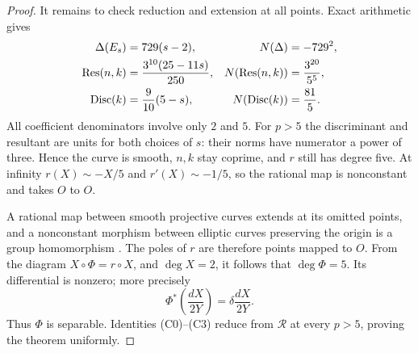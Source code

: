 \documentclass[11pt,a4paper]{article}
\theoremstyle{remark}
\DeclareMathOperator{\Res}{Res}
\DeclareMathOperator{\Disc}{Disc}
\begin{document}
\begin{proof}
It remains to check reduction and extension at all points. Exact
arithmetic gives
\begin{align}\label{eq:good-reduction}
 \Delta(E_s)&=729(s-2),&N(\Delta)&=-729^2,\notag\\
 \Res(n,k)&=\frac{3^{10}(25-11s)}{250},&
 N(\Res(n,k))&=\frac{3^{20}}{5^5},\\
 \Disc(k)&=\frac9{10}(5-s),&N(\Disc(k))&=\frac{81}{5}.\notag
\end{align}
All coefficient denominators involve only $2$ and $5$. For $p>5$
the discriminant and resultant are units for both choices of $s$:
their norms have numerator a power of three. Hence the curve is
smooth, $n,k$ stay coprime, and $r$ still has degree five. At infinity
$r(X)\sim-X/5$ and $r'(X)\sim-1/5$, so the rational map is
nonconstant and takes $O$ to $O$.

A rational map between smooth projective curves extends at its
omitted points, and a nonconstant morphism between elliptic curves
preserving the origin is a group homomorphism
\cite[Theorem~4.15 and Definition~4.20]{suth4}. The poles of $r$ are
therefore points mapped to $O$. From the diagram
$X\circ\Phi=r\circ X$, and $\deg X=2$, it follows that
$\deg\Phi=5$. Its differential is nonzero; more precisely
\[
 \Phi^*\left(\frac{dX}{2Y}\right)=\delta\frac{dX}{2Y}.
\]
Thus $\Phi$ is separable. Identities (C0)--(C3) reduce from
$\mathcal R$ at every $p>5$, proving the theorem uniformly.
\end{proof}
\end{document}
